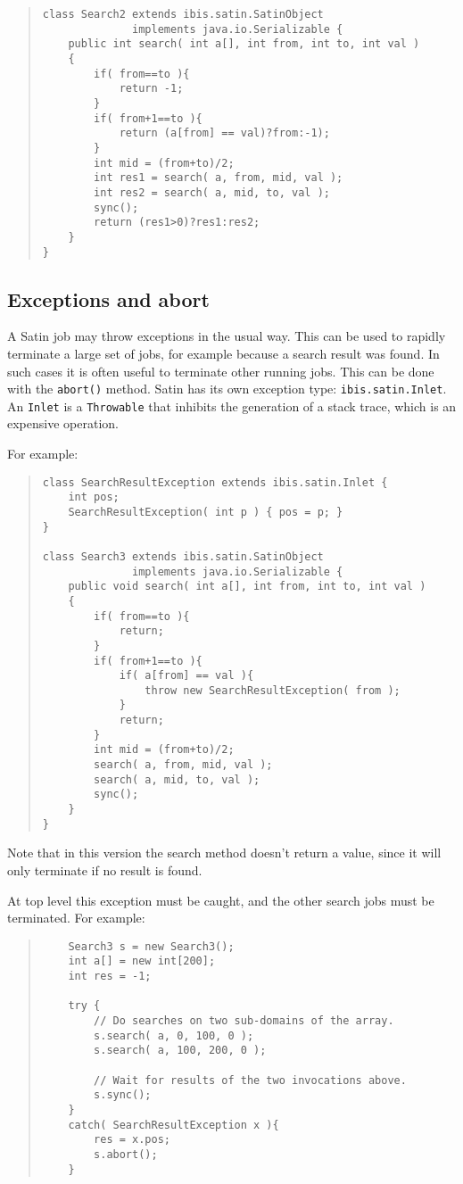 \documentclass[10pt]{article}
\newcommand{\mysubsection}[1]{\subsection{#1}\label{#1}}
\begin{document}
\begin{quote}
\begin{verbatim}
class Search2 extends ibis.satin.SatinObject
              implements java.io.Serializable {
    public int search( int a[], int from, int to, int val )
    {
        if( from==to ){
            return -1;
        }
        if( from+1==to ){
            return (a[from] == val)?from:-1);
        }
        int mid = (from+to)/2;
        int res1 = search( a, from, mid, val );
        int res2 = search( a, mid, to, val );
        sync();
        return (res1>0)?res1:res2;
    }
}
\end{verbatim}
\end{quote}

\mysubsection{Exceptions and abort}

A Satin job may throw exceptions in the usual way. This can be
used to rapidly terminate a large set of jobs, for example because
a search result was found. In such cases it is often useful to
terminate other running jobs.  This can be done with the
\verb+abort()+ method.
Satin has its own exception type: \verb+ibis.satin.Inlet+.
An \verb+Inlet+ is a \verb+Throwable+ that inhibits the generation of
a stack trace, which is an expensive operation.

For example:

\begin{quote}
\begin{verbatim}
class SearchResultException extends ibis.satin.Inlet {
    int pos;
    SearchResultException( int p ) { pos = p; }
}

class Search3 extends ibis.satin.SatinObject
              implements java.io.Serializable {
    public void search( int a[], int from, int to, int val )
    {
        if( from==to ){
            return;
        }
        if( from+1==to ){
            if( a[from] == val ){
                throw new SearchResultException( from );
            }
            return;
        }
        int mid = (from+to)/2;
        search( a, from, mid, val );
        search( a, mid, to, val );
        sync();
    }
}
\end{verbatim}
\end{quote}

Note that in this version the search method doesn't return a value,
since it will only terminate if no result is found.

At top level this exception must be caught, and the other search
jobs must be terminated. For example:

\begin{quote}
\begin{verbatim}
    Search3 s = new Search3();
    int a[] = new int[200];
    int res = -1;

    try {
        // Do searches on two sub-domains of the array.
        s.search( a, 0, 100, 0 );
        s.search( a, 100, 200, 0 );

        // Wait for results of the two invocations above.
        s.sync();
    }
    catch( SearchResultException x ){
        res = x.pos;
        s.abort();
    }
\end{verbatim}
\end{quote}
\end{document}
